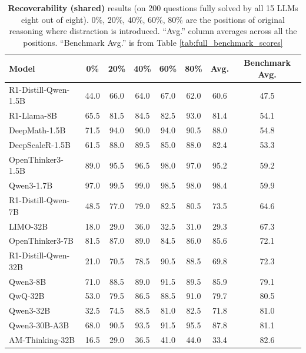 \documentclass{article} %
\begin{document}
\label{sec:appendix_recoverability_test}
\begin{table}[ht!]
  \centering
  \begin{tabular}{lcccccc|c}
    \toprule
    \textbf{Model} & \textbf{0\%} & \textbf{20\%} & \textbf{40\%} & \textbf{60\%} & \textbf{80\%} & \textbf{Avg.} & \textbf{Benchmark Avg.} \\
    \midrule
    R1-Distill-Qwen-1.5B    & 44.0 & 66.0 & 64.0 & 67.0 & 62.0 & 60.6 & 47.5 \\
    R1-Llama-8B             & 65.5 & 81.5 & 84.5 & 82.5 & 93.0 & 81.4 & 54.1 \\
    DeepMath-1.5B           & 71.5 & 94.0 & 90.0 & 94.0 & 90.5 & 88.0 & 54.8 \\
    DeepScaleR-1.5B         & 61.5 & 88.0 & 89.5 & 85.0 & 88.0 & 82.4 & 53.3 \\
    OpenThinker3-1.5B       & 89.0 & 95.5 & 96.5 & 98.0 & 97.0 & 95.2 & 59.2 \\
    Qwen3-1.7B              & 97.0 & 99.5 & 99.0 & 98.5 & 98.0 & 98.4 & 59.9 \\
    \midrule
    R1-Distill-Qwen-7B      & 48.5 & 77.0 & 79.0 & 82.5 & 80.5 & 73.5 & 64.6 \\
    LIMO-32B                & 18.0 & 29.0 & 36.0 & 32.5 & 31.0 & 29.3 & 67.3 \\
    OpenThinker3-7B         & 81.5 & 87.0 & 89.0 & 84.5 & 86.0 & 85.6 & 72.1 \\
    R1-Distill-Qwen-32B     & 21.0 & 70.5 & 78.5 & 90.5 & 88.5 & 69.8 & 72.3 \\
    \midrule
    Qwen3-8B                & 71.0 & 88.5 & 89.0 & 91.5 & 89.5 & 85.9 & 79.1 \\
    QwQ-32B                 & 53.0 & 79.5 & 86.5 & 88.5 & 91.0 & 79.7 & 80.5 \\
    Qwen3-32B               & 32.5 & 74.5 & 88.5 & 81.0 & 82.5 & 71.8 & 81.0 \\
    Qwen3-30B-A3B           & 68.0 & 90.5 & 93.5 & 91.5 & 95.5 & 87.8 & 81.1 \\
    AM-Thinking-32B      & 16.5 & 29.0 & 36.5 & 41.0 & 44.0  & 33.4 & 82.6 \\
    \bottomrule
  \end{tabular}
  \caption{\textbf{Recoverability (shared)} results (on 200 questions fully solved by all 15 LLMs eight out of eight). 0\%, 20\%, 40\%, 60\%, 80\% are the positions of original reasoning where distraction is introduced. ``Avg.'' column averages across all the positions. ``Benchmark Avg.'' is from Table \ref{tab:full_benchmark_scores}}
  \label{tab:recoverability_shared}
\end{table}
\end{document}
